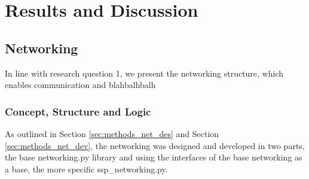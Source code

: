 \cleardoublepage%
\chapter{\label{chap:res}Results and Discussion}%


\section{\label{sec:res_networking}Networking}%

In line with research question 1, we present the networking structure, which enables communication and blahbalhbalh

\subsection{\label{sec:res_logic}Concept, Structure and Logic}

As outlined in Section \ref{sec:methods_net_des} and Section \ref{sec:methods_net_dev}, the networking was designed and developed in two parts, the base networking.py library and using the interfaces of the base networking as a base, the more specific ssp\_networking.py. \\

